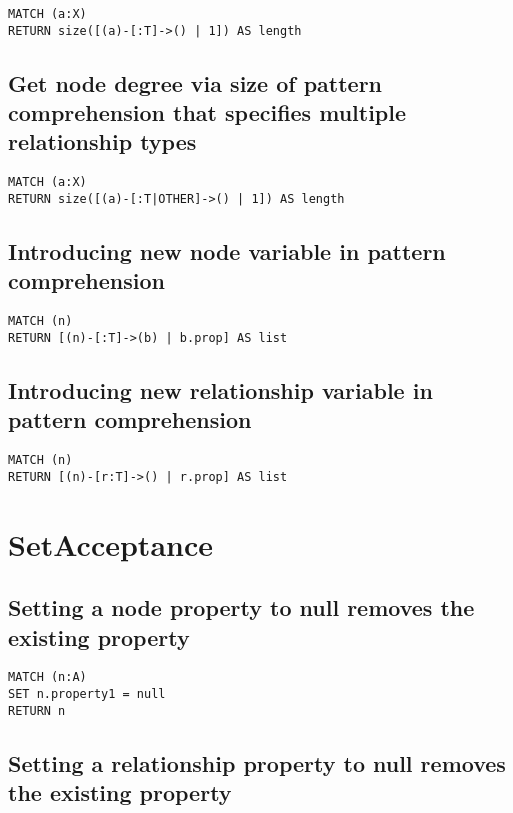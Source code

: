 \begin{lstlisting}
MATCH (a:X)
RETURN size([(a)-[:T]->() | 1]) AS length
\end{lstlisting}

\subsection{Get node degree via size of pattern comprehension that specifies multiple relationship types}

\begin{lstlisting}
MATCH (a:X)
RETURN size([(a)-[:T|OTHER]->() | 1]) AS length
\end{lstlisting}

\subsection{Introducing new node variable in pattern comprehension}

\begin{lstlisting}
MATCH (n)
RETURN [(n)-[:T]->(b) | b.prop] AS list
\end{lstlisting}

\subsection{Introducing new relationship variable in pattern comprehension}

\begin{lstlisting}
MATCH (n)
RETURN [(n)-[r:T]->() | r.prop] AS list
\end{lstlisting}
\section{SetAcceptance}


\subsection{Setting a node property to null removes the existing property}

\begin{lstlisting}
MATCH (n:A)
SET n.property1 = null
RETURN n
\end{lstlisting}

\subsection{Setting a relationship property to null removes the existing property}

